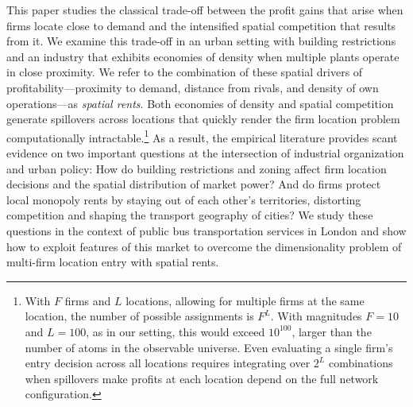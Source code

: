 \documentclass[12pt]{article}
\begin{document}
	
This paper studies the classical trade-off \citep[e.g.,][]{Hotelling1929,
salop1979monopolistic} between the profit gains that arise when firms locate 
close to demand and the intensified spatial competition that results from it. 
We examine this trade-off in an urban setting with building restrictions 
and an industry that exhibits economies of density when multiple plants 
operate in close proximity. We refer to the combination of these spatial 
drivers of profitability---proximity to demand, distance from rivals, and 
density of own operations---as \emph{spatial rents}. Both economies of 
density and spatial competition generate spillovers across locations that 
quickly render the firm location problem computationally intractable.\footnote{With $F$ firms and $L$ locations, allowing for multiple firms at the same location, the number of possible 
assignments is $F^L$. With magnitudes $F = 10$ and $L = 100$, as in our setting, this would exceed $10^{100}$, 
larger than the number of atoms in the observable universe. Even evaluating 
a single firm's entry decision across all locations requires integrating 
over $2^L$ combinations when spillovers make profits at each location 
depend on the full network configuration.
} As a 
result, the empirical literature provides scant evidence on two important 
questions at the intersection of industrial organization and urban policy: 
How do building restrictions and zoning affect firm location decisions and 
the spatial distribution of market power? And do firms protect local monopoly 
rents by staying out of each other's territories, distorting competition 
and shaping the transport geography of cities? We study these questions in the context of public 
bus transportation services in London and show how to exploit features of this market to overcome the dimensionality problem of multi-firm location entry with spatial rents. 
\end{document}
